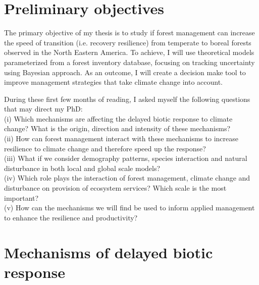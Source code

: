 
\section{Preliminary objectives}\label{obj}

The primary objective of my thesis is to study if forest management can increase the speed of transition (i.e. recovery resilience) from temperate to boreal forests observed in the North Eastern America.
To achieve, I will use theoretical models parameterized from a forest inventory database, focusing on tracking uncertainty using Bayesian approach.
As an outcome, I will create a decision make tool to improve management strategies that take climate change into account.

During these first few months of reading, I asked myself the following questions that may direct my PhD: \\
(i) Which mechanisms are affecting the delayed biotic response to climate change? What is the origin, direction and intensity of these mechanisms? \\
(ii) How can forest management interact with these mechanisms to increase resilience to climate change and therefore speed up the response? \\
(iii) What if we consider demography patterns, species interaction and natural disturbance in both local and global scale models? \\
(iv) Which role plays the interaction of forest management, climate change and disturbance on provision of ecosystem services? Which scale is the most important? \\
(v) How can the mechanisms we will find be used to inform applied management to enhance the resilience and productivity?

\section{Mechanisms of delayed biotic response}

